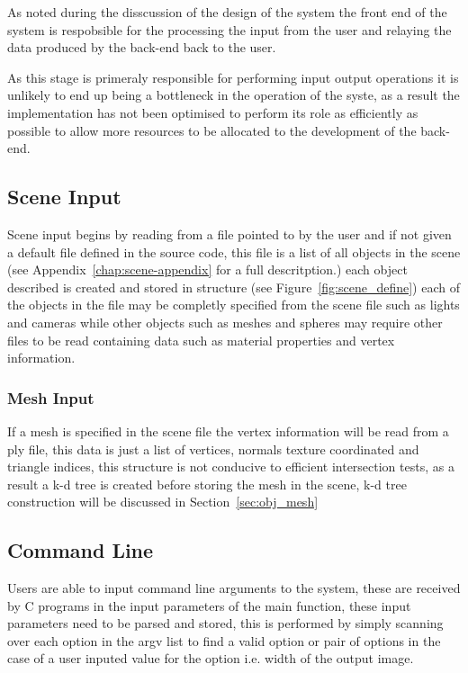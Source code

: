As noted during the disscussion of the design of the system the front end of the system is respobsible for the processing
the input from the user and relaying the data produced by the back-end back to the user.

As this stage is primeraly responsible
for performing input output operations it is unlikely to end up being a bottleneck in the operation of the syste, as a
result the implementation has not been optimised to perform its role as efficiently as possible to allow more resources
to be allocated to the development of the back-end.

\subsection{Scene Input}
Scene input begins by reading from a file pointed to by the user and if not given a default file defined in the source
code, this file is a list of all objects in the scene (see Appendix~\ref{chap:scene-appendix} for a full descritption.) each
object described is created and stored in structure (see Figure~\ref{fig:scene_define}) each of the objects in the
file may be completly specified from the scene file such as lights and cameras while other objects such as meshes
and spheres may require other files to be read containing data such as material properties and vertex information.

\subsubsection{Mesh Input}
If a mesh is specified in the scene file the vertex information will be read from a ply file, this data is just a list
of vertices, normals texture coordinated and triangle indices, this structure is not conducive to efficient intersection
tests, as a result a k-d tree is created before storing the mesh in the scene, k-d tree construction will be discussed in
Section~\ref{sec:obj_mesh}

\subsection{Command Line}
Users are able to input command line arguments to the system, these are received by C programs in the input parameters of
the main function, these input parameters need to be parsed and stored, this is performed by simply scanning over each
option in the argv list to find a valid option or pair of options in the case of a user inputed value for the option
i.e. width of the output image.

